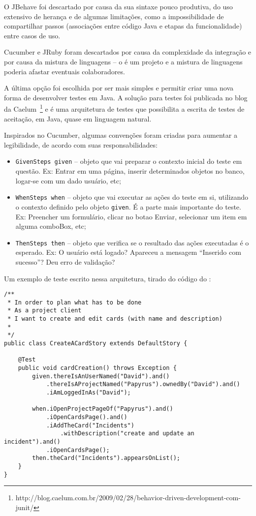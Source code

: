 O JBehave foi descartado por causa da sua sintaxe pouco produtiva, do uso extensivo de herança e de algumas limitações, como a impossibilidade de compartilhar passos (associações entre código Java e etapas da funcionalidade) entre casos de uso.

Cucumber e JRuby foram descartados por causa da complexidade da integração e por causa da mistura de linguagens -- o \calopsita é um projeto \opensource e a mistura de linguagens poderia afastar eventuais colaboradores.

A última opção foi escolhida por ser mais simples e permitir criar uma nova forma de desenvolver testes em Java. A solução para testes foi publicada no blog da Caelum~\footnote{http://blog.caelum.com.br/2009/02/28/behavior-driven-development-com-junit/} e é uma arquitetura de testes que possibilita a escrita de testes de aceitação, em Java, quase em linguagem natural. 

Inspirados no Cucumber, algumas convenções foram criadas para aumentar a legibilidade, de acordo com suas responsabilidades:

\begin{itemize}
	\item{\texttt{GivenSteps given} -- objeto que vai preparar o contexto inicial do teste em questão. Ex: Entrar em uma página, inserir determinados objetos no banco, logar-se com um dado usuário, etc;}
	\item{\texttt{WhenSteps when} -- objeto que vai executar as ações do teste em si, utilizando o contexto definido pelo objeto \texttt{given}. É a parte mais importante do teste. Ex: Preencher um formulário, clicar no botao Enviar, selecionar um item em alguma comboBox, etc;}
	\item{\texttt{ThenSteps then} -- objeto que verifica se o resultado das ações executadas é o esperado. Ex: O usuário está logado? Apareceu a mensagem ``Inserido com sucesso''? Deu erro de validação?}
\end{itemize}

Um exemplo de teste escrito nessa arquitetura, tirado do código do \calopsita:

\begin{lstlisting}
/**
 * In order to plan what has to be done
 * As a project client
 * I want to create and edit cards (with name and description)
 *
 */
public class CreateACardStory extends DefaultStory {

	@Test
	public void cardCreation() throws Exception {
		given.thereIsAnUserNamed("David").and()
			.thereIsAProjectNamed("Papyrus").ownedBy("David").and()
			.iAmLoggedInAs("David");

		when.iOpenProjectPageOf("Papyrus").and()
		    .iOpenCardsPage().and()
			.iAddTheCard("Incidents")
				.withDescription("create and update an incident").and()
			.iOpenCardsPage();
		then.theCard("Incidents").appearsOnList();
	}
}
\end{lstlisting}

